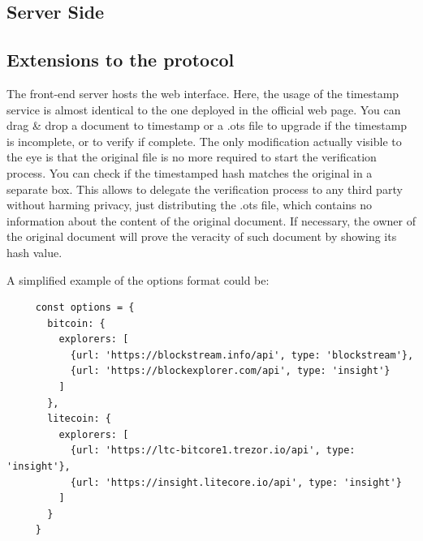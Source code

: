 \bigskip
\subsection{Server Side}

\subsection{Extensions to the protocol}
The front-end server hosts the web interface. Here, the usage of the timestamp service is almost identical to the one deployed in the official web page. You can drag \& drop a document to timestamp or a \colorbox{light-gray}{.ots} file to upgrade if the timestamp is incomplete, or to verify if complete. The only modification actually visible to the eye is that the original file is no more required to start the verification process. You can check if the timestamped hash matches the original in a separate box. This allows to delegate the verification process to any third party without harming privacy, just distributing the \colorbox{light-gray}{.ots} file, which contains no information about the content of the original document. If necessary, the owner of the original document will prove the veracity of such document by showing its hash value.

\bigskip
\noindent
 A simplified example of the options format could be:
    \begin{lstlisting}
     const options = {
       bitcoin: {
         explorers: [
           {url: 'https://blockstream.info/api', type: 'blockstream'},
           {url: 'https://blockexplorer.com/api', type: 'insight'}
         ]
       },
       litecoin: {
         explorers: [
           {url: 'https://ltc-bitcore1.trezor.io/api', type: 'insight'},
           {url: 'https://insight.litecore.io/api', type: 'insight'}
         ]
       }
     }
    \end{lstlisting}